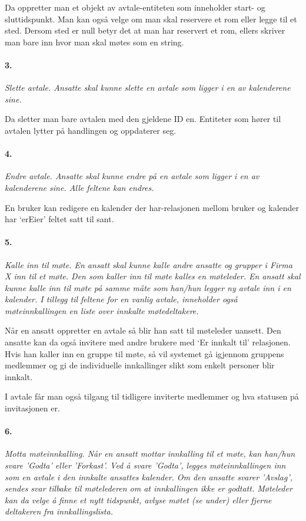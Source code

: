 \documentclass[titlepage]{article}
\begin{document}
Da oppretter man et objekt av avtale-entiteten som inneholder start- og sluttidspunkt. Man kan også velge om man skal reservere et rom eller legge til et sted. Dersom sted er null betyr det at man har reservert et rom, ellers skriver man bare inn hvor man skal møtes som en string.

\paragraph{3.}\textit{ Slette avtale. Ansatte skal kunne slette en avtale som ligger i en av kalenderene sine.}

Da sletter man bare avtalen med den gjeldene ID en. Entiteter som hører til avtalen lytter på handlingen og oppdaterer seg.

\paragraph{4.}\textit{ Endre avtale. Ansatte skal kunne endre på en avtale som ligger i en av kalenderene sine. Alle feltene kan endres.}

En bruker kan redigere en kalender der har-relasjonen mellom bruker og kalender har ‘erEier’ feltet satt til sant. 

\paragraph{5.}\textit{ Kalle inn til møte. En ansatt skal kunne kalle andre ansatte og grupper i Firma X inn til et møte. Den som kaller inn til møte kalles en møteleder. En ansatt skal kunne kalle inn til møte på samme måte som han/hun legger ny avtale inn i en kalender. I tillegg til
feltene for en vanlig avtale, inneholder også møteinnkallingen en liste over innkalte
møtedeltakere.}

Når en ansatt oppretter en avtale så blir han satt til møteleder uansett. Den ansatte kan da også invitere med andre brukere med ‘Er innkalt til’ relasjonen. Hvis han kaller inn en gruppe til møte, så vil systemet gå igjennom gruppens medlemmer og gi de individuelle innkallinger slikt som enkelt personer blir innkalt. 

I avtale får man også tilgang til tidligere inviterte medlemmer og hva statusen på invitasjonen er. 


\paragraph{6.}\textit{ Motta møteinnkalling. Når en ansatt mottar innkalling til et møte, kan han/hun svare
'Godta' eller 'Forkast'. Ved å svare 'Godta', legges møteinnkallingen inn som en avtale
i den innkalte ansattes kalender. Om den ansatte svarer 'Avslag', sendes svar tilbake til
møtelederen om at innkallingen ikke er godtatt. Møteleder kan da velge å finne et nytt
tidspunkt, avlyse møtet (se under) eller fjerne deltakeren fra innkallingslista.}
\end{document}
